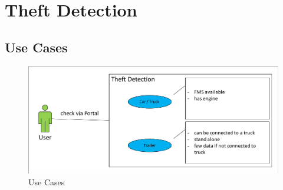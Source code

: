 \chapter{Theft Detection}

\section{Use Cases}

\begin{figure} [h]
    \includegraphics[clip, trim=0.1cm 0.1cm 0.1cm 0.1cm, width=1\textwidth]{src/pic/UseCase}
    \caption{Use Cases}
    \label{UseCases}
\end{figure}

